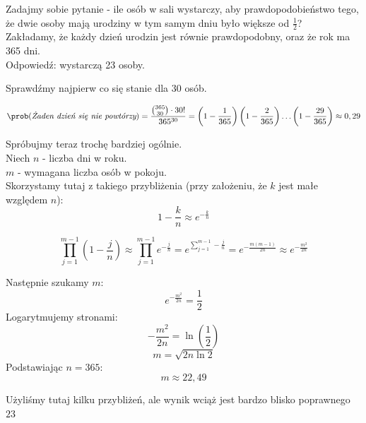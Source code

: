 Zadajmy sobie pytanie - ile osób w sali wystarczy, aby prawdopodobieństwo tego, że dwie osoby
mają urodziny w tym samym dniu było większe od \( \frac{1}{2} \)?\\
Zakładamy, że każdy dzień urodzin jest równie prawdopodobny, oraz że rok ma 365 dni.\\
Odpowiedź: wystarczą 23 osoby.

\begin{example}
	Sprawdźmy najpierw co się stanie dla 30 osób.

	\[
		\prob(\textit{Żaden dzień się nie powtórzy}) = \frac{\binom{365}{30} \cdot 30!}{365^{30}} = \left(1 - \frac{1}{365} \right)\left( 1 - \frac{2}{365} \right)\ldots\left(1 - \frac{29}{365}\right) \approx 0,29
	\]

\end{example}

\begin{example}
	Spróbujmy teraz trochę bardziej ogólnie.\\
	Niech \( n \) - liczba dni w roku.\\
	\( m \) - wymagana liczba osób w pokoju.\\

	Skorzystamy tutaj z takiego przybliżenia (przy założeniu, że \( k \) jest małe względem \( n \)):
	\[
		1 - \frac{k}{n} \approx e^{-\frac{k}{n}}
	\]

	\[
		\prod_{j = 1}^{m - 1}\left( 1 - \frac{j}{n} \right) \approx \prod_{j = 1}^{m - 1}e^{-\frac{j}{n}} = e^{\sum_{j = 1}^{m - 1}-\frac{j}{n}} = e^{-\frac{m(m-1)}{2n}} \approx e^{-\frac{m^2}{2n}}
	\]

	Następnie szukamy \( m \):
	\[
		e^{-\frac{m^2}{2n}} = \frac{1}{2}
	\]
	Logarytmujemy stronami:
	\[
		-\frac{m^2}{2n} = \ln\left(\frac{1}{2}\right)
	\]
	\[
		m = \sqrt{2n\ln2}
	\]
	Podstawiając \( n = 365 \):
	\[
		m \approx 22,49
	\]

	Użyliśmy tutaj kilku przybliżeń, ale wynik wciąż jest bardzo blisko poprawnego \(23\)
\end{example}

